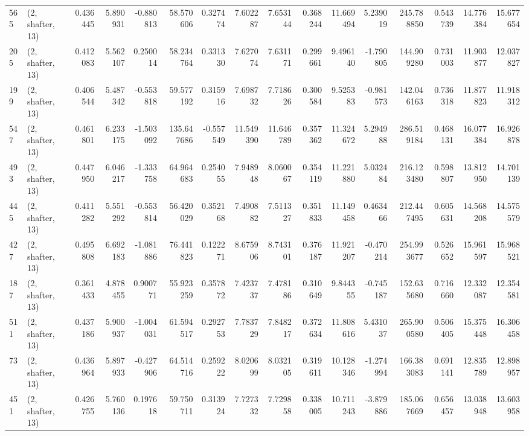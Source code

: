 \begin{tabular}{llrrrrrrrrrrrrrr}
565 &  (2, shafter, 13) &   0.436445 &   5.890931 &  -0.880813 &    58.570606 &   0.327474 &   7.602287 &   7.653144 &  0.368244 &  11.669494 &   5.239019 &    245.788850 &   0.543739 &  14.776384 &   15.677654 \\
205 &  (2, shafter, 13) &   0.412083 &   5.562107 &   0.250014 &    58.234764 &   0.331330 &   7.627074 &   7.631171 &  0.299661 &   9.496140 &  -1.790805 &    144.909280 &   0.731003 &  11.903877 &   12.037827 \\
199 &  (2, shafter, 13) &   0.406544 &   5.487342 &  -0.553818 &    59.577192 &   0.315916 &   7.698732 &   7.718626 &  0.300584 &   9.525383 &  -0.981573 &    142.046163 &   0.736318 &  11.877823 &   11.918312 \\
547 &  (2, shafter, 13) &   0.461801 &   6.233175 &  -1.503092 &   135.647686 &  -0.557549 &  11.549390 &  11.646789 &  0.357362 &  11.324672 &   5.294988 &    286.519184 &   0.468131 &  16.077384 &   16.926878 \\
493 &  (2, shafter, 13) &   0.447950 &   6.046217 &  -1.333758 &    64.964683 &   0.254055 &   7.948948 &   8.060067 &  0.354119 &  11.221880 &   5.032484 &    216.123480 &   0.598807 &  13.812950 &   14.701139 \\
445 &  (2, shafter, 13) &   0.411282 &   5.551292 &  -0.553814 &    56.420029 &   0.352168 &   7.490882 &   7.511327 &  0.351833 &  11.149458 &   0.463466 &    212.447495 &   0.605631 &  14.568208 &   14.575579 \\
427 &  (2, shafter, 13) &   0.495808 &   6.692183 &  -1.081886 &    76.441823 &   0.122271 &   8.675906 &   8.743101 &  0.376187 &  11.921207 &  -0.470214 &    254.993677 &   0.526652 &  15.961597 &   15.968521 \\
187 &  (2, shafter, 13) &   0.361433 &   4.878455 &   0.900771 &    55.923259 &   0.357872 &   7.423737 &   7.478186 &  0.310649 &   9.844355 &  -0.745187 &    152.635680 &   0.716660 &  12.332087 &   12.354581 \\
511 &  (2, shafter, 13) &   0.437186 &   5.900937 &  -1.004031 &    61.594517 &   0.292753 &   7.783729 &   7.848217 &  0.372634 &  11.808616 &   5.431037 &    265.900580 &   0.506405 &  15.375448 &   16.306458 \\
73  &  (2, shafter, 13) &   0.436964 &   5.897933 &  -0.427906 &    64.514716 &   0.259222 &   8.020699 &   8.032105 &  0.319611 &  10.128346 &  -1.274994 &    166.383083 &   0.691141 &  12.835789 &   12.898957 \\
451 &  (2, shafter, 13) &   0.426755 &   5.760136 &   0.197618 &    59.750711 &   0.313924 &   7.727332 &   7.729858 &  0.338005 &  10.711243 &  -3.879886 &    185.067669 &   0.656457 &  13.038948 &   13.603958 \\

\end{tabular}
